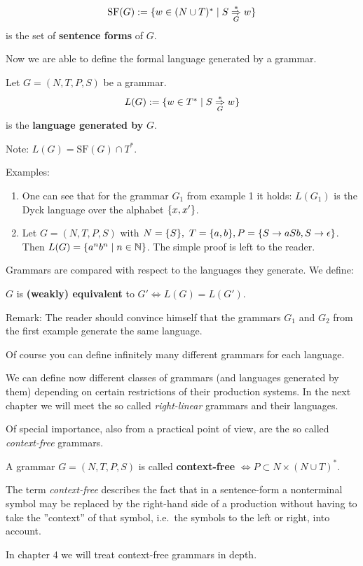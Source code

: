 \begin{definition}
\[ \mathrm{SF}(G) := \mbox{$\{w \in (N \cup T)^* \mid S \underset{{G}}{\overset{*}{\Rightarrow}} w\}$} \]
is the set of {\bf sentence forms} of $G$.
\end{definition}

Now we are able to define the formal language generated by a grammar.

\begin{definition}
Let $G = (N, T, P, S)$ be a grammar.
\[ L(G) := \mbox{$\{w \in T^* \mid S \underset{{G}}{\overset{*}{\Rightarrow}} w\}$} \]
is the {\bf language generated by} $G$.
\end{definition}

Note: $L(G) = \mathrm{SF}(G) \cap T^*$.

Examples:
\begin{enumerate}
  \item One can see that for the grammar $G_1$ from example 1 it holds: $L(G_1)$
  is the Dyck language over the alphabet $\mbox{$\{x, x'\}$}$.
  \item Let $G = (N, T, P, S)$ with $N = \mbox{$\{S\}$},\ T = \mbox{$\{a, b\}$},\\
  P = \mbox{$\{S \to aSb, S \to \epsilon\}$}$.\\
  Then $L(G) = \mbox{$\{a^n b^n \mid n \in \mathbb{N}\}$}$. The simple proof is left
  to the reader.
\end{enumerate}

Grammars are compared with respect to the languages they generate. We define:

\begin{definition}
$G$ is {\bf (weakly) equivalent} to $G' \iff L(G) = L(G')$.
\end{definition}

Remark: The reader should convince himself that the grammars $G_1$ and $G_2$
from the first example generate the same language.

Of course you can define infinitely many different grammars for each language.

We can define now different classes of grammars (and languages generated by
them) depending on certain restrictions of their production systems. In the next
chapter we will meet the so called {\em right-linear} grammars and their
languages.

Of special importance, also from a practical point of view, are the so
called {\em context-free} grammars.

\begin{definition}
A grammar $G = (N, T, P, S)$ is called {\bf context-free} $\iff P \subset N
\times (N \cup T)^*$.
\end{definition}

The term {\em context-free} describes the fact that in a sentence-form a
nonterminal symbol may be replaced by the right-hand side of a production
without having to take the ''context'' of that symbol, i.e.\ the symbols to the
left or right, into account.

In chapter 4 we will treat context-free grammars in depth.
